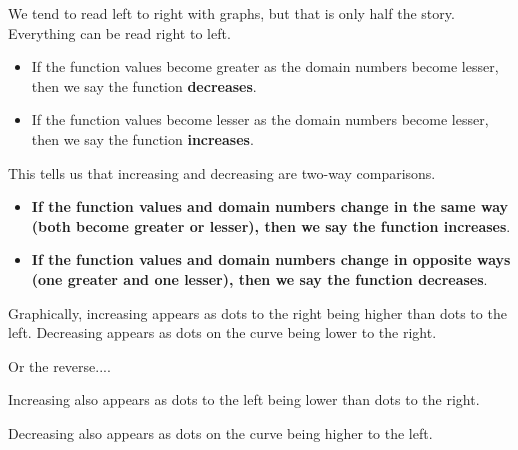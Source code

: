 \documentclass{ximera}
\begin{document}
\begin{warning}
We tend to read left to right with graphs, but that is only half the story.  Everything can be read right to left. 


\begin{itemize}
    \item If the function values become greater as the domain numbers become lesser, then we say the function \textbf{decreases}.  
    \item If the function values become lesser as the domain numbers become lesser, then we say the function \textbf{increases}.  
\end{itemize}


This tells us that increasing and decreasing are two-way comparisons.

\begin{itemize}
    \item \textbf{\textcolor{purple!85!blue}{If the function values and domain numbers change in the same way (both become greater or lesser), then we say the function \textbf{increases}}}.  
    \item \textbf{\textcolor{purple!85!blue}{If the function values and domain numbers change in opposite ways (one greater and one lesser), then we say the function \textbf{decreases}}}. 
\end{itemize}






\end{warning}














Graphically, increasing appears as dots to the right being higher than dots to the left.  Decreasing appears as dots on the curve being lower to the right. 


Or the reverse....


Increasing also appears as dots to the left being lower than dots to the right.  

Decreasing also appears as dots on the curve being higher to the left. 
\end{document}
